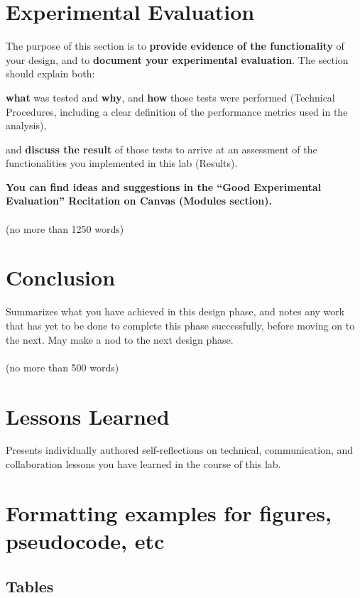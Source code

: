 \documentclass{article}
\begin{document}
\section{Experimental Evaluation}
The purpose of this section is to \textbf{provide evidence of the functionality} of your design, and to \textbf{document your experimental evaluation}. The section should explain both:

\begin{enumerate}
\begin{item}
\textbf{what} was tested and \textbf{why}, and \textbf{how} those tests were performed (Technical Procedures, including a clear definition of the performance metrics used in the analysis),
\end{item}
\begin{item}
and \textbf{discuss the result} of those tests to arrive at an assessment of the functionalities you implemented in this lab (Results).
\end{item}
\end{enumerate}

\textbf{You can find ideas and suggestions in the “Good Experimental Evaluation” Recitation on Canvas (Modules section).}\\\\
(no more than 1250 words)

\section{Conclusion}
Summarizes what you have achieved in this design phase, and notes any work that has yet to be done to complete this phase successfully, before moving on to the next. May make a nod to the next design phase.\\\\
(no more than 500 words)

\section{Lessons Learned}
Presents individually authored self-reflections on technical, communication, and collaboration lessons you have learned in the course of this lab.

\section{Formatting examples for figures, pseudocode, etc}

\subsection{Tables}
\end{document}
